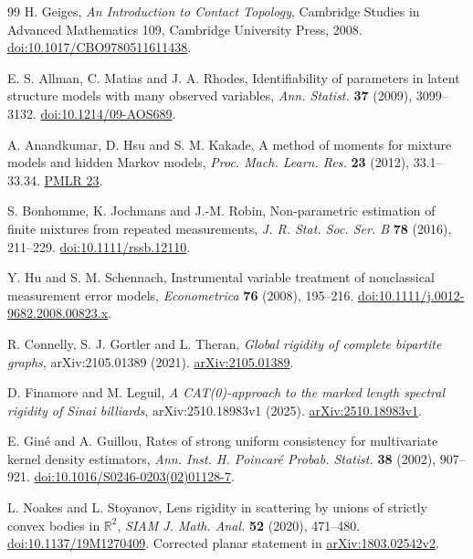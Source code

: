 \begin{thebibliography}{99}
H. Geiges, \emph{An Introduction to Contact Topology},
Cambridge Studies in Advanced Mathematics 109, Cambridge University Press, 2008.
\href{https://doi.org/10.1017/CBO9780511611438}{doi:10.1017/CBO9780511611438}.

E. S. Allman, C. Matias and J. A. Rhodes,
Identifiability of parameters in latent structure models with many observed
variables, \emph{Ann. Statist.} \textbf{37} (2009), 3099--3132.
\href{https://doi.org/10.1214/09-AOS689}{doi:10.1214/09-AOS689}.

A. Anandkumar, D. Hsu and S. M. Kakade,
A method of moments for mixture models and hidden Markov models,
\emph{Proc. Mach. Learn. Res.} \textbf{23} (2012), 33.1--33.34.
\href{https://proceedings.mlr.press/v23/anandkumar12.html}{PMLR 23}.

S. Bonhomme, K. Jochmans and J.-M. Robin,
Non-parametric estimation of finite mixtures from repeated measurements,
\emph{J. R. Stat. Soc. Ser. B} \textbf{78} (2016), 211--229.
\href{https://doi.org/10.1111/rssb.12110}{doi:10.1111/rssb.12110}.

Y. Hu and S. M. Schennach,
Instrumental variable treatment of nonclassical measurement error models,
\emph{Econometrica} \textbf{76} (2008), 195--216.
\href{https://doi.org/10.1111/j.0012-9682.2008.00823.x}{doi:10.1111/j.0012-9682.2008.00823.x}.

R. Connelly, S. J. Gortler and L. Theran,
\emph{Global rigidity of complete bipartite graphs}, arXiv:2105.01389 (2021).
\href{https://arxiv.org/abs/2105.01389}{arXiv:2105.01389}.

D. Finamore and M. Leguil,
\emph{A CAT(0)-approach to the marked length spectral rigidity of Sinai billiards},
arXiv:2510.18983v1 (2025).
\href{https://arxiv.org/abs/2510.18983v1}{arXiv:2510.18983v1}.

E. Gin\'e and A. Guillou,
Rates of strong uniform consistency for multivariate kernel density estimators,
\emph{Ann. Inst. H. Poincar\'e Probab. Statist.} \textbf{38} (2002), 907--921.
\href{https://doi.org/10.1016/S0246-0203(02)01128-7}{doi:10.1016/S0246-0203(02)01128-7}.

L. Noakes and L. Stoyanov,
Lens rigidity in scattering by unions of strictly convex bodies in $\mathbb R^2$,
\emph{SIAM J. Math. Anal.} \textbf{52} (2020), 471--480.
\href{https://doi.org/10.1137/19M1270409}{doi:10.1137/19M1270409}.
Corrected planar statement in
\href{https://arxiv.org/abs/1803.02542v2}{arXiv:1803.02542v2}.


\end{thebibliography}
